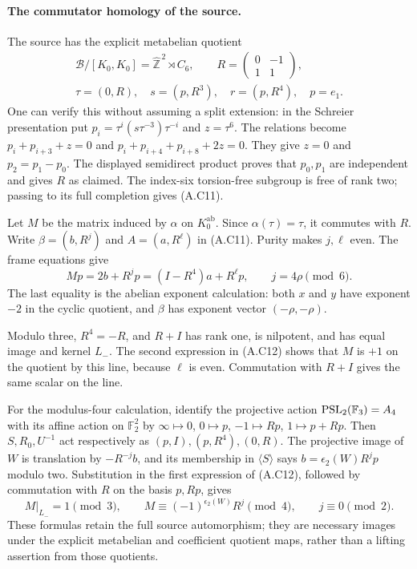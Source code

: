 \paragraph{The commutator homology of the source.}
The source has the explicit metabelian quotient
\[
 \begin{gathered}
 \mathcal B/[K_0,K_0]
   =\widehat{\mathbb Z}^{\,2}\rtimes C_6,\qquad
 R=\begin{pmatrix}0&-1\\1&1\end{pmatrix},\\
 \tau=(0,R),\quad s=(p,R^3),\quad r=(p,R^4),\quad p=e_1.
 \end{gathered}
 \tag{A.C11}
\]
One can verify this without assuming a split extension: in the
Schreier presentation put $p_i=\tau^i(s\tau^{-3})\tau^{-i}$ and
$z=\tau^6$. The relations become
$p_i+p_{i+3}+z=0$ and $p_i+p_{i+4}+p_{i+8}+2z=0$. They give
$z=0$ and $p_2=p_1-p_0$. The displayed semidirect product proves
that $p_0,p_1$ are independent and gives $R$ as claimed. The
index-six torsion-free subgroup is free of rank two; passing to
its full completion gives (A.C11).

Let $M$ be the matrix induced by $\alpha$ on $K_0^{\mathrm{ab}}$.
Since $\alpha(\tau)=\tau$, it commutes with $R$. Write
$\beta=(b,R^j)$ and $A=(a,R^\ell)$ in (A.C11). Purity makes
$j,\ell$ even. The frame equations give
\[
 Mp=2b+R^jp=(I-R^4)a+R^\ell p,\qquad j=4\rho\pmod6.
 \tag{A.C12}
\]
The last equality is the abelian exponent calculation: both $x$
and $y$ have exponent $-2$ in the cyclic quotient, and $\beta$
has exponent vector $(-\rho,-\rho)$.

Modulo three, $R^4=-R$, and $R+I$ has rank one, is nilpotent,
and has equal image and kernel $L_-$. The second expression in
(A.C12) shows that $M$ is $+1$ on the quotient by this line,
because $\ell$ is even. Commutation with $R+I$ gives the same
scalar on the line.

For the modulus-four calculation, identify the projective action
$\operatorname{PSL}_2(\mathbb F_3)=A_4$ with its affine action on
$\mathbb F_2^2$ by
$\infty\mapsto0$, $0\mapsto p$, $-1\mapsto Rp$,
$1\mapsto p+Rp$. Then $S,R_0,U^{-1}$ act respectively as
$(p,I),(p,R^4),(0,R)$. The projective image of $W$ is translation
by $-R^{-j}b$, and its membership in $\langle S\rangle$ says
$b=\epsilon_2(W)R^jp$ modulo two. Substitution in the first
expression of (A.C12), followed by commutation with $R$ on the
basis $p,Rp$, gives
\[
 M|_{L_-}=1\pmod3,\qquad
 M\equiv(-1)^{\epsilon_2(W)}R^j\pmod4,\qquad j\equiv0\pmod2.
 \tag{A.C13}
\]
These formulas retain the full source automorphism; they are
necessary images under the explicit metabelian and coefficient
quotient maps, rather than a lifting assertion from those quotients.

